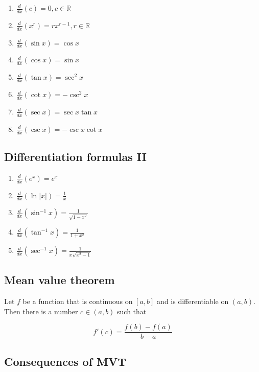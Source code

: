 \documentclass[
]{article}
\begin{document}
\begin{enumerate}
\def\labelenumi{\arabic{enumi}.}
\item
  \(\frac{d}{dx}(c)=0, c \in \mathbb{R}\)
\item
  \(\frac{d}{dx}(x^r)=rx^{r-1}, r \in \mathbb{R}\)
\item
  \(\frac{d}{dx}(\sin x)=\cos x\)
\item
  \(\frac{d}{dx}(\cos x)=\sin x\)
\item
  \(\frac{d}{dx}(\tan x)=\sec^2x\)
\item
  \(\frac{d}{dx}(\cot x)=-\csc^2x\)
\item
  \(\frac{d}{dx}(\sec x) = \sec x\tan x\)
\item
  \(\frac{d}{dx}(\csc x)=-\csc x\cot x\)
\end{enumerate}

\hypertarget{differentiation-formulas-ii}{%
\subsection{Differentiation formulas
II}\label{differentiation-formulas-ii}}

\begin{enumerate}
\def\labelenumi{\arabic{enumi}.}
\item
  \(\frac{d}{dx}(e^x) = e^x\)
\item
  \(\frac{d}{dx}(\ln|x|) = \frac{1}{x}\)
\item
  \(\frac{d}{dx}(\sin^{-1}x) = \frac{1}{\sqrt{1-x^2}}\)
\item
  \(\frac{d}{dx}(\tan^{-1}x) = \frac{1}{1+x^2}\)
\item
  \(\frac{d}{dx}(\sec^{-1}x) = \frac{1}{x \sqrt{x^2-1}}\)
\end{enumerate}

\hypertarget{mean-value-theorem}{%
\subsection{Mean value theorem}\label{mean-value-theorem}}

Let \(f\) be a function that is continuous on \([a,b]\) and is
differentiable on \((a,b)\). Then there is a number \(c\in(a,b)\) such
that

\[ f'(c)=\frac{f(b)-f(a)}{b-a} \]

\hypertarget{consequences-of-mvt}{%
\subsection{Consequences of MVT}\label{consequences-of-mvt}}
\end{document}
